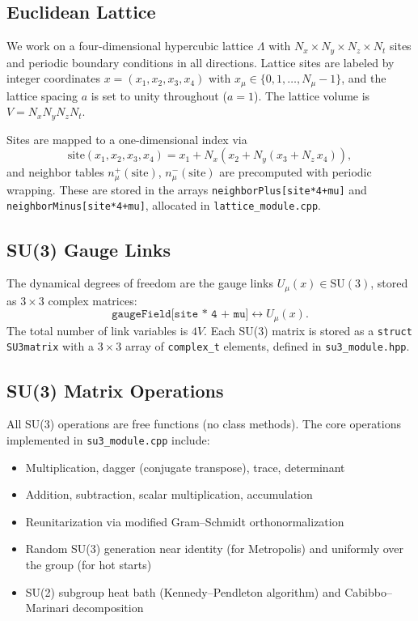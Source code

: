 \documentclass[12pt]{article}
\newcommand{\code}[1]{\texttt{#1}}
\begin{document}
\subsection{Euclidean Lattice}

We work on a four-dimensional hypercubic lattice $\Lambda$ with $N_x \times N_y \times N_z \times N_t$ sites and periodic boundary conditions in all directions. Lattice sites are labeled by integer coordinates $x = (x_1, x_2, x_3, x_4)$ with $x_\mu \in \{0, 1, \ldots, N_\mu - 1\}$, and the lattice spacing $a$ is set to unity throughout ($a = 1$). The lattice volume is $V = N_x N_y N_z N_t$.

Sites are mapped to a one-dimensional index via
\begin{equation}
\label{eq:site_index}
\mathrm{site}(x_1, x_2, x_3, x_4) = x_1 + N_x(x_2 + N_y(x_3 + N_z \, x_4)),
\end{equation}
and neighbor tables $n^+_\mu(\mathrm{site})$, $n^-_\mu(\mathrm{site})$ are precomputed with periodic wrapping. These are stored in the arrays \code{neighborPlus[site*4+mu]} and \code{neighborMinus[site*4+mu]}, allocated in \code{lattice\_module.cpp}.

\subsection{SU(3) Gauge Links}

The dynamical degrees of freedom are the gauge links $U_\mu(x) \in \mathrm{SU}(3)$, stored as $3\times 3$ complex matrices:
\begin{equation}
\code{gaugeField[site * 4 + mu]} \longleftrightarrow U_\mu(x).
\end{equation}
The total number of link variables is $4V$. Each SU(3) matrix is stored as a \code{struct SU3matrix} with a $3\times 3$ array of \code{complex\_t} elements, defined in \code{su3\_module.hpp}.

\subsection{SU(3) Matrix Operations}

All SU(3) operations are free functions (no class methods). The core operations implemented in \code{su3\_module.cpp} include:
\begin{itemize}
\item Multiplication, dagger (conjugate transpose), trace, determinant
\item Addition, subtraction, scalar multiplication, accumulation
\item Reunitarization via modified Gram--Schmidt orthonormalization
\item Random SU(3) generation near identity (for Metropolis) and uniformly over the group (for hot starts)
\item SU(2) subgroup heat bath (Kennedy--Pendleton algorithm) and Cabibbo--Marinari decomposition
\end{itemize}
\end{document}
